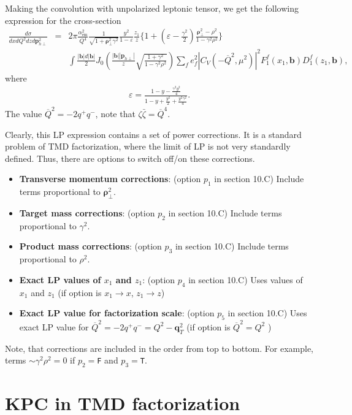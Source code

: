 \documentclass[prd,nofootinbib,eqsecnum,final]{revtex4}
\newcommand{\nn}{\nonumber}
\renewcommand{\(}{\left(}
\renewcommand{\)}{\right)}
\renewcommand{\[}{\left[}
\renewcommand{\]}{\right]}
\renewcommand{\vec}[1]{\bm{#1}}
\begin{document}
Making the convolution with unpolarized leptonic tensor, we get the following expression for the cross-section
\begin{eqnarray}
\frac{d\sigma}{dx dQ^2 dz d\vec p_{h\perp}^2}&=&2\pi\frac{\alpha^2_{\text{em}}}{Q^4}\frac{1}{\sqrt{1+\vec \rho_{\perp}^2 \gamma^2}}\frac{y^2}{1-\varepsilon}
\frac{z_1}{z}\Bigg\{1+\(\varepsilon-\frac{\gamma^2}{2}\)\frac{\vec \rho^2_\perp-\rho^2}{1-\gamma^2\rho^2}\Bigg\}
\\\nn && \int \frac{|\vec b|d|\vec b|}{2} J_0\(\frac{|\vec b||\vec p_{h\perp}|}{z}\sqrt{\frac{1+\gamma^2}{1-\gamma^2 \rho^2}}\)\sum_f e_f^2|C_V(-\overline{Q}^2,\mu^2)|^2 F_1^f(x_1,\vec b)D_1^f(z_1,\vec b),
\end{eqnarray}
where 
\begin{eqnarray}
\varepsilon=\frac{1-y-\frac{\gamma^2y^2}{4}}{1-y+\frac{y^2}{2}+\frac{y^2 \gamma^2}{4}}.
\end{eqnarray}
The value $\overline{Q}^2=-2q^+q^-$, note that $\zeta\bar \zeta=\overline{Q}^4$. 

Clearly, this LP expression contains a set of power corrections. It is a standard problem of TMD factorization, where the limit of LP is not very standardly defined. Thus, there are options to switch off/on these corrections.
\begin{itemize}
\item \textbf{Transverse momentum corrections}: (option $p_1$ in section 10.C) Include terms proportional to $\vec \rho_\perp^2$.
\item \textbf{Target mass corrections}: (option $p_2$ in section 10.C) Include terms proportional to $\gamma^2$.
\item \textbf{Product mass corrections}: (option $p_3$ in section 10.C) Include terms proportional to $\rho^2$.
\item \textbf{Exact LP values of $x_1$ and $z_1$}: (option $p_4$ in section 10.C) Uses values of $x_1$ and $z_1$ (if option is  $x_1\to x$, $z_1\to z$)
\item \textbf{Exact LP value for factorization scale}: (option $p_5$ in section 10.C) Uses exact LP value for $\overline{Q}^2=-2q^+q^-=Q^2-\vec q_T^2$ (if option is  $\overline{Q}^2=Q^2$ )
\end{itemize}
Note, that corrections are included in the order from top to bottom. For example, terms $\sim \gamma^2 \rho^2=0$ if $p_2=$\texttt{F} and $p_3=$\texttt{T}.

\newpage

\section{KPC in TMD factorization}
\end{document}
